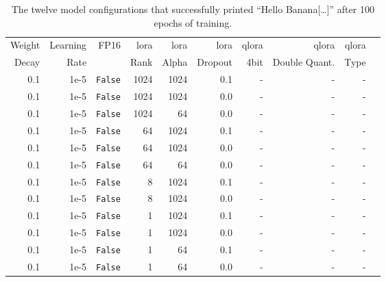\begin{table}
    \centering
    \small
    \caption{The twelve model configurations that successfully printed \enquote{Hello Banana[\dots]} after 100 epochs of training.}
    \begin{tabular}{rrrrrrrrrr}
        \hline
        Weight & Learning & FP16 & \ac{lora} & \ac{lora} & \ac{lora} & \ac{qlora} & \ac{qlora} & \ac{qlora} \\
        Decay & Rate & & Rank & Alpha & Dropout & 4bit & Double Quant. & Type \\
        \hline
        0.1 & 1e-5 & \texttt{False} & 1024 & 1024 & 0.1 & - & - & - \\
        0.1 & 1e-5 & \texttt{False} & 1024 & 1024 & 0.0 & - & - & - \\
        0.1 & 1e-5 & \texttt{False} & 1024 & 64 & 0.0 & - & - & - \\
        0.1 & 1e-5 & \texttt{False} & 64 & 1024 & 0.1 & - & - & - \\
        0.1 & 1e-5 & \texttt{False} & 64 & 1024 & 0.0 & - & - & - \\
        0.1 & 1e-5 & \texttt{False} & 64 & 64 & 0.0 & - & - & - \\
        0.1 & 1e-5 & \texttt{False} & 8 & 1024 & 0.1 & - & - & - \\
        0.1 & 1e-5 & \texttt{False} & 8 & 1024 & 0.0 & - & - & - \\
        0.1 & 1e-5 & \texttt{False} & 1 & 1024 & 0.1 & - & - & - \\
        0.1 & 1e-5 & \texttt{False} & 1 & 1024 & 0.0 & - & - & - \\
        0.1 & 1e-5 & \texttt{False} & 1 & 64 & 0.1 & - & - & - \\
        0.1 & 1e-5 & \texttt{False} & 1 & 64 & 0.0 & - & - & - \\
        \hline
    \end{tabular}
    \label{tab:banana}
\end{table}



